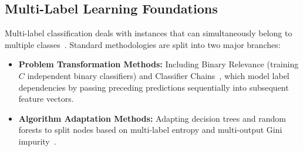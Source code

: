 \documentclass[conference]{IEEEtran}
\begin{document}
\subsection{Multi-Label Learning Foundations}
Multi-label classification deals with instances that can simultaneously belong to multiple classes~\cite{tsoumakas2007multi}. Standard methodologies are split into two major branches:
\begin{itemize}
    \item \textbf{Problem Transformation Methods:} Including Binary Relevance (training $C$ independent binary classifiers) and Classifier Chains~\cite{read2011classifier}, which model label dependencies by passing preceding predictions sequentially into subsequent feature vectors.
    \item \textbf{Algorithm Adaptation Methods:} Adapting decision trees and random forests to split nodes based on multi-label entropy and multi-output Gini impurity~\cite{zhang2013review}.
\end{itemize}
\end{document}
